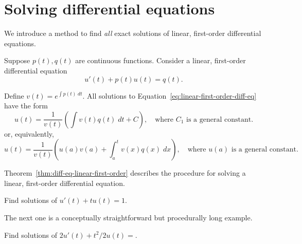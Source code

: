\documentclass[../main.tex]{subfiles}
\begin{document}
 \section{Solving differential equations}

We introduce a method to find \emph{all} exact solutions of linear, first-order differential equations.

\begin{thm} \label{thm:diff-eq-linear-first-order}
  Suppose \(p(t), q(t)\) are continuous functions. Consider a linear, first-order differential equation
  \begin{equation} \label{eq:linear-first-order-diff-eq}
    u'(t) + p(t) u(t) = q(t).
  \end{equation}
  
  Define \(v(t) = e^{\int p(t) \;dt}\). All solutions to Equation~\eqref{eq:linear-first-order-diff-eq} have the form
  \[
    u(t) = \frac{1}{v(t)} \left( \int v(t) q(t) \;dt + C \right), \quad\text{where \(C_{1}\) is a general constant}.
  \]
  or, equivalently,
  \[
    u(t) = \frac{1}{v(t)} \left( u(a)v(a) + \int_{a}^{t} v(x) q(x) \;dx \right), \quad\text{where \(u(a)\) is a general constant}.
  \]
\end{thm}

Theorem~\ref{thm:diff-eq-linear-first-order} describes the procedure for solving a linear, first-order differential equation. 
\begin{example}
  Find solutions of \(u'(t) + t u(t) = 1\).
\end{example}

The next one is a conceptually straightforward but procedurally long example.  
\begin{example}
  Find solutions of \(2u'(t) + t^{2}/2 u(t) = \).
\end{example}
\end{document}
